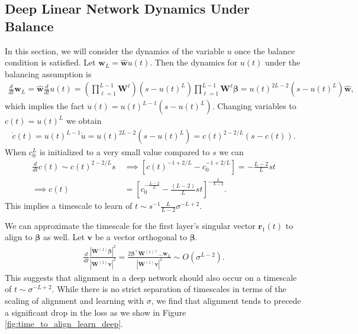 \documentclass{article} %
\begin{document}
\begin{appendix}
\subsection{Deep Linear Network Dynamics Under Balance}\label{app:deep_linear_dynamics_ct}

In this section, we will consider the dynamics of the variable $u$ once the balance condition is satisfied. Let $\bm w_L = \bm{\hat w} u(t)$. Then the dynamics for $u(t)$ under the balancing assumption is
\begin{align}
    \frac{d}{dt} \bm w_L =  \bm{\hat w} \frac{d}{dt} u(t) = \left( \prod_{\ell=1}^{L-1} \bm W^{\ell} \right) ( s - u(t)^L )  \prod_{\ell=1}^{L-1} \bm W^{\ell} \bm\beta = u(t)^{2L-2} ( s - u(t)^L ) \bm{\hat w},
\end{align}
which implies the fact $\dot{u}(t) = u(t)^{L-1}(s-u(t)^L)$. Changing variables to $c(t) = u(t)^L$ we obtain 
\begin{align}
    \dot{c}(t) = u(t)^{L-1} \dot{u} = u(t)^{2L-2} (s-u(t)^L) = c(t)^{2-2/L} (s-c(t)).
\end{align}
When $c_0^L$ is initialized to a very small value compared to $s$ we can 
\begin{equation}
\begin{aligned}
    \frac{d}{dt} c(t) \sim c(t)^{2-2/L} s \ &\implies  \left[ c(t)^{-1+ 2/L} - c_0^{-1 + 2/L} \right] =  - \frac{L-2}{L} st
    \\
    \implies c(t) &= \left[ c_0^{- \frac{L-2}{L} } - \frac{\left(L-2\right)}{L} st  \right]^{- \frac{L}{L-2}}.
\end{aligned}
\end{equation}
This implies a timescale to learn of $t \sim s^{-1} \frac{L}{L-2} \sigma^{-L+2}$.

We can approximate the timescale for the first layer's singular vector $\bm r_1(t)$ to align to $\bm\beta$ as well. Let $\bm v$ be a vector orthogonal to $\bm\beta$. 
\begin{align}
    \frac{d}{dt} \frac{|\bm W^{(1)} \bm\beta|^2}{|\bm W^{(1)} \bm v|^2} = \frac{2 \bm\beta^\top \bm W^{(1) \top} ...\bm w_L}{|\bm W^{(1)} \bm v|^2} \sim O( \sigma^{L-2}).
\end{align}
This suggests that alignment in a deep network should also occur on a timescale of $t \sim \sigma^{-L + 2}$. While there is no strict separation of timescales in terms of the scaling of alignment and learning with $\sigma$, we find that alignment tends to precede a significant drop in the loss as we show in Figure \ref{fig:time_to_align_learn_deep}.


\end{appendix}
\end{document}
